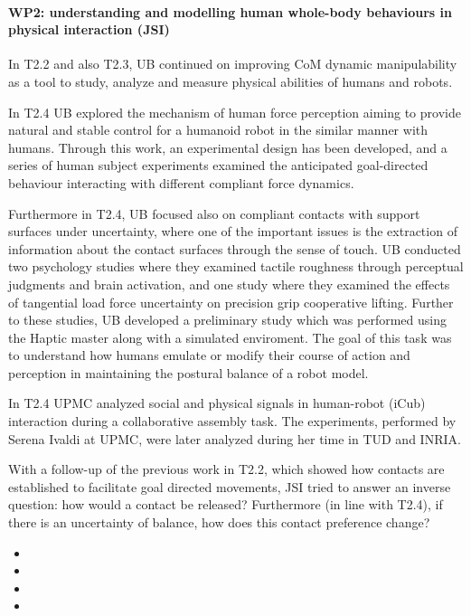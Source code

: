  
\paragraph*{WP2: understanding and modelling human whole-body behaviours in physical interaction (JSI)}

In T2.2 and also T2.3, UB continued on improving CoM dynamic manipulability as a tool to study, analyze and measure physical abilities of humans and robots.

In T2.4 UB explored the mechanism of human force perception aiming to provide natural and stable control for a humanoid robot in the similar manner with humans. Through this work, an experimental design has been developed, and a series of human subject experiments examined the anticipated goal-directed behaviour interacting with different compliant force dynamics.

Furthermore in T2.4, UB focused also on compliant contacts with support surfaces under uncertainty, where one of the important issues is the extraction of information about the contact surfaces through the sense of touch. UB conducted two psychology studies where they examined tactile roughness through perceptual judgments and brain activation, and one study where they examined the effects of tangential load force uncertainty on precision grip cooperative lifting. Further to these studies, UB developed a preliminary study which was performed using the Haptic master along with a simulated enviroment. The goal of this task was to understand how humans emulate or modify their course of action and perception in maintaining the postural balance of a robot model. 

In T2.4 UPMC analyzed social and physical signals in human-robot (iCub) interaction during a collaborative assembly task. The experiments, performed by Serena Ivaldi at UPMC, were later analyzed during her time in TUD and INRIA.

With a follow-up of the previous work in T2.2, which showed how contacts are established to facilitate goal directed movements, JSI tried to answer an inverse question: how would a contact be released? Furthermore (in line with T2.4), if there is an uncertainty of balance, how does this contact preference change?

\begin{itemize}

\item 
\item 
\item 
\item 

 \end{itemize}
